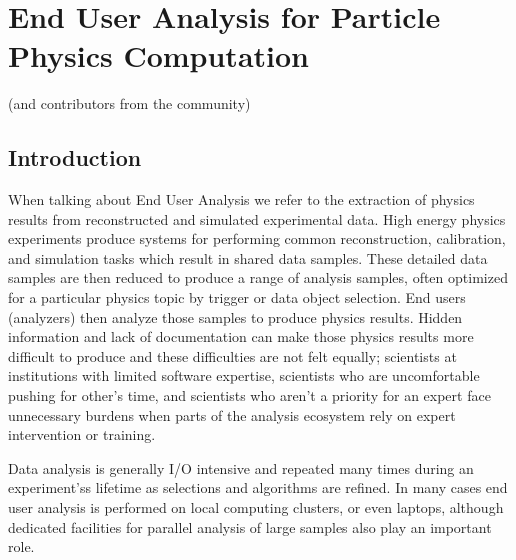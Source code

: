 
\setcounter{chapter}{4} 


\chapter{End User Analysis for Particle Physics Computation}

   {(and contributors from the community)}


\section{Introduction}
When talking about End User Analysis we refer to the extraction of physics results from reconstructed and simulated experimental data. High energy physics experiments produce systems for performing common reconstruction, calibration, and simulation tasks which result in shared data samples. These detailed data samples are then reduced to produce a range of analysis samples, often optimized for a particular physics topic by trigger or data object selection. End users (analyzers) then analyze those samples to produce physics results.  Hidden information and lack of documentation can make those physics results more difficult to produce and these difficulties are not felt equally; scientists at institutions with limited software expertise, scientists who are uncomfortable pushing for other's time, and scientists who aren't a priority for an expert face unnecessary burdens when parts of the analysis ecosystem rely on expert intervention or training. 

Data analysis is generally I/O intensive and repeated many times during an experiment'ss lifetime as selections and algorithms are refined. In many cases end user analysis is performed on local computing clusters, or even laptops, although dedicated facilities for parallel analysis of large samples also play an important role.

